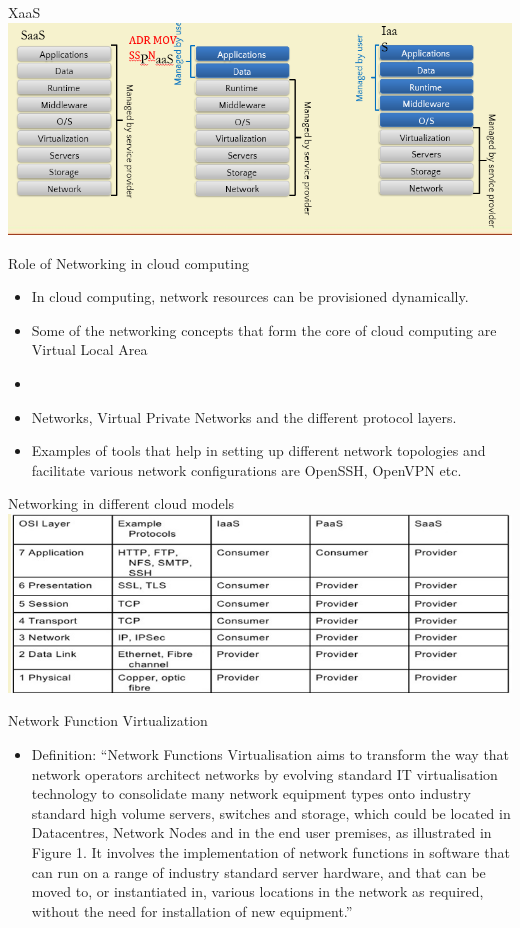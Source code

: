 \documentclass{SKP-beamer}
\begin{document}
  \begin{frame}{XaaS}
 	\includegraphics[scale=0.7]{y.png}
 \end{frame}
 
 \begin{frame}{Role of Networking in cloud computing}
 	\begin{itemize}
 		\item In cloud computing, network resources can be provisioned dynamically.
 		\item Some of the networking concepts that form the core of cloud computing are Virtual Local Area \item \item Networks, Virtual Private Networks and the different protocol layers.
 		\item Examples of tools that help in setting up different network topologies and facilitate various network configurations are OpenSSH, OpenVPN etc. 			 		 		
 	\end{itemize}
 \end{frame}
 
  \begin{frame}{Networking in different cloud models}
 	\includegraphics[scale=0.7]{z.png}
 \end{frame}
 
 \begin{frame}{Network Function Virtualization}
 	\begin{itemize}
 		\item Definition: “Network Functions Virtualisation aims to transform the way that network operators architect networks by evolving standard IT virtualisation technology to consolidate many network equipment types onto industry standard high volume servers, switches and storage, which could be located in Datacentres, Network Nodes and in the end user premises, as illustrated in Figure 1. It involves the implementation of network functions in software that can run on a range of industry standard server hardware, and that can be moved to, or instantiated in, various locations in the network as required, without the need for installation of new equipment.”			 		 		
 	\end{itemize}
 \end{frame}
 
\end{document}
